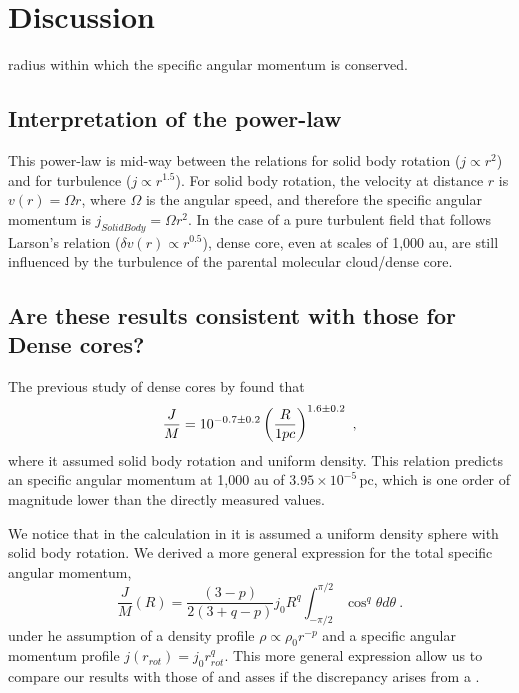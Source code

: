 \section{Discussion}


radius within which the specific angular momentum is conserved. 

\subsection{Interpretation of the power-law}
This power-law is mid-way between the relations for solid body rotation ($j\propto r^{2}$) and for turbulence ($j\propto r^{1.5}$). 
For solid body rotation, the velocity at distance $r$ is $v(r)=\Omega r$, 
where $\Omega$ is the angular speed, 
and therefore the specific angular momentum is $j_{SolidBody}=\Omega r^2$. 
In the case of a pure turbulent field that follows Larson's relation ($\delta v(r) \propto r^{0.5}$),  dense core, even at scales of 1,000 au, are still 
influenced by the turbulence of the parental molecular cloud/dense core.


\subsection{Are these results consistent with those for Dense cores?}
The previous study of dense cores by \cite{Goodman_1993} found that 
\begin{equation}
\frac{J}{M} = 10^{-0.7\pm0.2} \left(\frac{R}{\textrm 1 pc}\right)^{1.6\pm 0.2}~,
\end{equation}
where it assumed solid body rotation and uniform density. 
This relation predicts an specific angular momentum at 1,000 au of $3.95\times 10^{-5}$\,\kms pc, 
which is one order of magnitude lower than the directly measured values.

We notice that in the calculation in \cite{Goodman_1993} it is assumed a uniform density sphere 
with solid body rotation. 
We derived a more general expression for the total specific angular momentum, 
\begin{equation}
\frac{J}{M}(R) = \frac{(3-p)}{2(3+q-p)} j_0 R^{q} 
\int_{-\pi/2}^{\pi/2} \cos^q \theta d\theta~.
\end{equation}
under he assumption of a density profile $\rho \propto \rho_0 r^{-p}$ and a specific angular momentum 
profile $j(r_{rot}) = j_0 r_{rot}^q$. 
This more general expression allow us to compare our results with those of \cite{Goodman_1993} and asses 
if the discrepancy arises from a .

